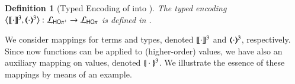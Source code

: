 \documentclass[preprint,11pt]{elsarticle}
\newtheorem{definition}{Definition}[section]
\begin{document}
{%
%

\begin{definition}
[Typed Encoding of \HOpp into \HOp]
\label{d:enc:hopptohop}
The typed encoding
$\big\langle \llbracket\cdot\rrbracket^{3}, (\!\!\langle\cdot\rangle\!\!)^{3}\big\rangle: \mathcal{L}_\mathsf{HO\pi^{+}} \to \mathcal{L}_{\mathsf{HO}\pi}$ is defined
in .
\end{definition}

We consider mappings for terms and types, denoted $\llbracket\cdot\rrbracket^{3}$ and $(\!\!\langle\cdot\rangle\!\!)^{3}$, respectively.
Since now functions can be applied to (higher-order) values, we have also an auxiliary mapping on values, denoted $\{\!|\cdot|\!\}^3$. 
We illustrate the essence of these mappings by means of an example.

}
\end{document}
